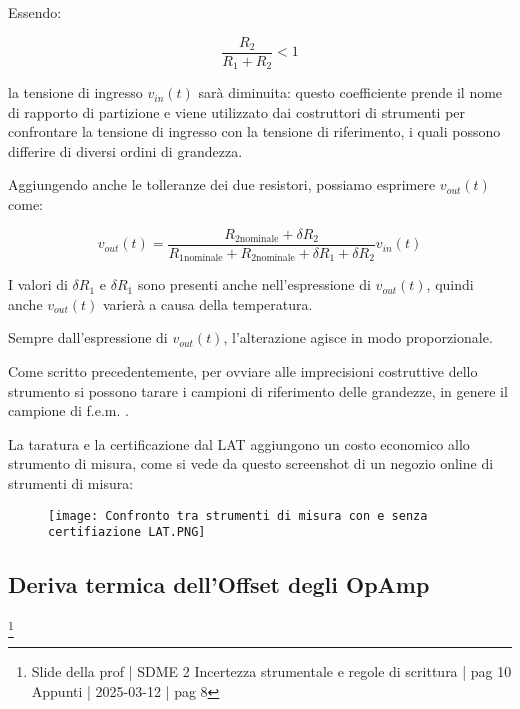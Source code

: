 Essendo: 

{
    \Large 
    \begin{equation}
    \frac{R_2}{R_1 + R_2} < 1       
    \end{equation}
}

la tensione di ingresso $v_{in} (t)$ sarà diminuita: questo coefficiente prende il nome di rapporto di partizione 
e viene utilizzato dai costruttori di strumenti per confrontare la tensione di ingresso con la tensione di riferimento, i quali possono differire di diversi ordini di grandezza. \newline 

Aggiungendo anche le tolleranze dei due resistori, possiamo esprimere $v_{out} (t)$ come: 

{
    \Large 
    \begin{equation}
        v_{out} (t)
        = 
        \frac{R_{2 \text{nominale}} + \delta R_2}{ R_{1 \text{nominale}}+ R_{2 \text{nominale}} + \delta R_1 + \delta R_2} v_{in} (t) 
    \end{equation}
}

I valori di $\delta R_1$ e $\delta R_1$ sono presenti anche nell'espressione di $ v_{out} (t)$, 
quindi anche  $ v_{out} (t)$ varierà a causa della temperatura. \newline 

Sempre dall'espressione di  $ v_{out} (t)$, l'alterazione agisce in modo proporzionale. \newline 

Come scritto precedentemente, per ovviare alle imprecisioni costruttive dello strumento 
si possono tarare i campioni di riferimento delle grandezze, in genere il campione di f.e.m. . \newline 

La taratura e la certificazione dal LAT aggiungono un costo economico allo strumento di misura, 
come si vede da questo screenshot di un negozio online di strumenti di misura: 

\begin{figure}[h]
    \centering
    \texttt{[image: Confronto tra strumenti di misura con e senza certifiazione LAT.PNG]}
\end{figure}


\newpage 

\subsection{Deriva termica dell'Offset degli OpAmp}
\footnote{Slide della prof | SDME 2 Incertezza strumentale e regole di scrittura | pag 10 \\  
Appunti | 2025-03-12 | pag 8}

